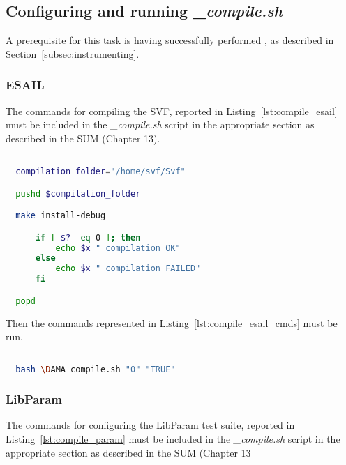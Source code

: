 \subsection{Configuring and running \emph{\DAMA\_compile.sh}}

A prerequisite for this task is having successfully performed , as described in Section~\ref{subsec:instrumenting}.

\subsubsection{ESAIL}

The commands for compiling the SVF, reported in Listing~\ref{lst:compile_esail} must be included in the \emph{\DAMA\_compile.sh} script in the appropriate section as described in the SUM (Chapter 13).


  \begin{lstlisting}[language=bash, label={lst:compile_esail}]

  compilation_folder="/home/svf/Svf"

  pushd $compilation_folder

  make install-debug

      if [ $? -eq 0 ]; then
          echo $x " compilation OK"
      else
          echo $x " compilation FAILED"
      fi

  popd

  \end{lstlisting}

Then the commands represented in Listing~\ref{lst:compile_esail_cmds} must be run.

  \begin{lstlisting}[language=bash, label={lst:compile_esail_cmds}]

  bash \DAMA_compile.sh "0" "TRUE"

  \end{lstlisting}

\subsubsection{LibParam}

The commands for configuring the LibParam test suite, reported in Listing~\ref{lst:compile_param} must be included in the \emph{\DAMA\_compile.sh} script in the appropriate section as described in the SUM (Chapter 13


